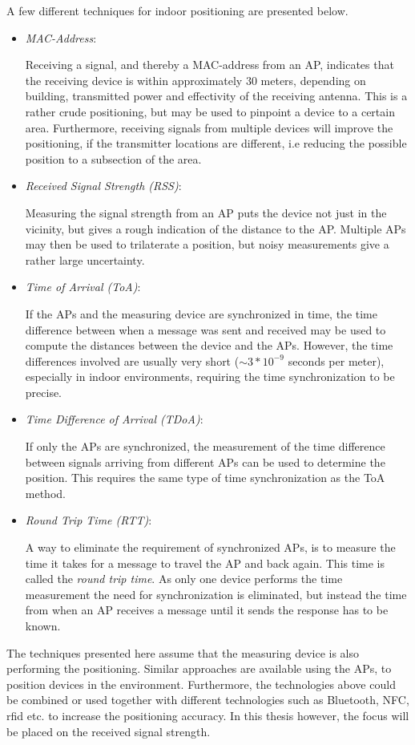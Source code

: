 \documentclass{LTHthesis}
\begin{document}
A few different techniques for indoor positioning are presented below.
%
\begin{itemize}
\item \emph{MAC-Address}:  

Receiving a signal, and thereby a MAC-address from an AP, indicates that the receiving device is within approximately $30$ meters, depending on building, transmitted power and effectivity of the receiving antenna. This is a rather crude positioning, but may be used to pinpoint a device to a certain area. Furthermore, receiving signals from multiple devices will improve the positioning, if the transmitter locations are different, i.e reducing the possible position to a subsection of the area. 
%
\item \emph{Received Signal Strength (RSS)}:

Measuring the signal strength from an AP puts the device not just in the vicinity, but gives a rough indication of the distance to the AP. Multiple APs may then be used to trilaterate a position, but noisy measurements give a rather large uncertainty. 
%
\item \emph{Time of Arrival (ToA)}:

If the APs and the measuring device are synchronized in time, the time difference between when a message was sent and received may be used to compute the distances between the device and the APs. However, the time differences involved are usually very short ($\sim 3*10^{-9}$ seconds per meter), especially in indoor environments, requiring the time synchronization to be precise.  
%
\item \emph{Time Difference of Arrival (TDoA)}:

If only the APs are synchronized, the measurement of the time difference between signals arriving from different APs can be used to determine the position. This requires the same type of time synchronization as the ToA method. 

\item \emph{Round Trip Time (RTT)}: 

A way to eliminate the requirement of synchronized APs, is to measure the time it takes for a message to travel the AP and back again. This time is called the \emph{round trip time}. As only one device performs the time measurement the need for synchronization is eliminated, but instead the time from when an AP receives a message until it sends the response has to be known.
%
\end{itemize}
%
The techniques presented here assume that the measuring device is also performing the positioning. Similar approaches are available using the APs, to position devices in the environment. Furthermore, the technologies above could be combined or used together with different technologies such as Bluetooth, NFC, rfid etc. to increase the positioning accuracy. 
In this thesis however, the focus will be placed on the received signal strength.
%
\end{document}
